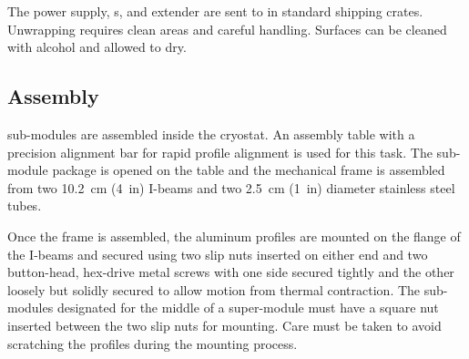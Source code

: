The power supply, \fdth{}s, and  extender are sent to  in standard shipping crates. Unwrapping requires clean areas and careful handling. Surfaces can be cleaned with alcohol and allowed to dry.

\subsection{Assembly}
\label{sec:dp-hv-assembly}



 sub-modules are assembled inside the  cryostat. An assembly table with a precision alignment bar for rapid profile alignment is used for this task.  The sub-module package is opened on the table and the mechanical frame is assembled %
from two \SI{10.2}{\cm} (\SI{4}{in})  I-beams and two \SI{2.5}{\cm} (\SI{1}{in}) diameter stainless steel tubes.

Once the frame is assembled, the aluminum profiles are mounted on the flange of the  I-beams and secured using two slip nuts inserted on either end and two button-head, hex-drive metal screws with one side secured tightly and the other loosely but solidly secured to allow motion from thermal contraction.  
The sub-modules designated for the middle %
of a super-module must have a square nut inserted  between the two slip nuts for  mounting. Care must be taken to avoid scratching %
the profiles %
during the mounting process.  

